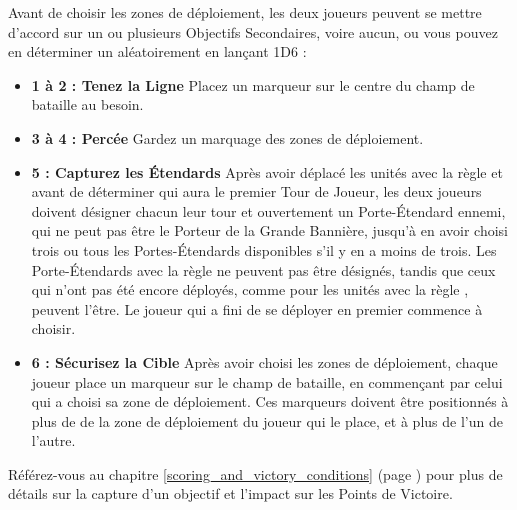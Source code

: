Avant de choisir les zones de déploiement, les deux joueurs peuvent se mettre d'accord sur un ou plusieurs Objectifs Secondaires, voire aucun, ou vous pouvez en déterminer un aléatoirement en lançant 1D6 : 
\begin{itemize}[label={-}]
\item \textbf{1 à 2 : Tenez la Ligne}\newline
{}\newline
Placez un marqueur sur le centre du champ de bataille au besoin.
\item \textbf{3 à 4 : Percée}\newline
{}\newline
Gardez un marquage des zones de déploiement.
\item \textbf{5 : Capturez les Étendards}\newline
{}\newline
Après avoir déplacé les unités avec la règle \vanguard{} et avant de déterminer qui aura le premier Tour de Joueur, les deux joueurs doivent désigner chacun leur tour et ouvertement un Porte-Étendard ennemi, qui ne peut pas être le Porteur de la Grande Bannière, jusqu'à en avoir choisi trois ou tous les Portes-Étendards disponibles s'il y en a moins de trois. Les Porte-Étendards avec la règle \lighttroops{} ne peuvent pas être désignés, tandis que ceux qui n'ont pas été encore déployés, comme pour les unités avec la règle \ambush{}, peuvent l'être. Le joueur qui a fini de se déployer en premier commence à choisir.
\item \textbf{6 : Sécurisez la Cible}\newline
{}\newline
Après avoir choisi les zones de déploiement, chaque joueur place un marqueur sur le champ de bataille, en commençant par celui qui a choisi sa zone de déploiement. Ces marqueurs doivent être positionnés à plus de  de la zone de déploiement du joueur qui le place, et à plus de  l'un de l'autre.
\end{itemize}

Référez-vous au chapitre \ref{scoring_and_victory_conditions} (page \pageref{scoring_and_victory_conditions}) pour plus de détails sur la capture d'un objectif et l'impact sur les Points de Victoire.

